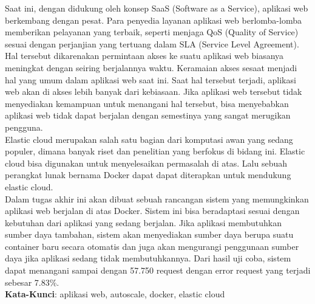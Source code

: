 \begin{abstrak}
		Saat ini, dengan didukung oleh konsep SaaS (Software as a Service), aplikasi web berkembang dengan pesat. Para penyedia layanan aplikasi web berlomba-lomba memberikan pelayanan yang terbaik, seperti menjaga QoS (Quality of Service) sesuai dengan perjanjian yang tertuang dalam SLA (Service Level Agreement). Hal tersebut dikarenakan permintaan akses ke suatu aplikasi web biasanya meningkat dengan seiring berjalannya waktu. Keramaian akses sesaat menjadi hal yang umum dalam aplikasi web saat ini. Saat hal tersebut terjadi, aplikasi web akan di akses lebih banyak dari kebiasaan. Jika aplikasi web tersebut tidak menyediakan kemampuan untuk menangani hal tersebut, bisa menyebabkan aplikasi web tidak dapat berjalan dengan semestinya yang sangat merugikan pengguna. \\
        \indent Elastic cloud merupakan salah satu bagian dari komputasi awan yang sedang populer, dimana banyak riset dan penelitian yang berfokus di bidang ini. Elastic cloud bisa digunakan untuk menyelesaikan permasalah di atas. Lalu sebuah perangkat lunak bernama Docker dapat dapat diterapkan untuk mendukung elastic cloud. \\
        \indent Dalam tugas akhir ini akan dibuat sebuah rancangan sistem yang memungkinkan aplikasi web berjalan di atas Docker. Sistem ini bisa beradaptasi sesuai dengan kebutuhan dari aplikasi yang sedang berjalan. Jika aplikasi membutuhkan sumber daya tambahan, sistem akan menyediakan sumber daya berupa suatu container baru secara otomatis dan juga akan mengurangi penggunaan sumber daya jika aplikasi sedang tidak membutuhkannya. Dari hasil uji coba, sistem dapat menangani sampai dengan 57.750 request dengan error request yang terjadi sebesar 7.83\%. \\

	\noindent \textbf{Kata-Kunci}: aplikasi web, autoscale, docker, elastic cloud
\end{abstrak}
\newpage
